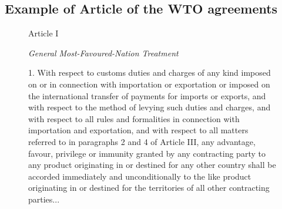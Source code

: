 \documentclass[12pt,letterpaper]{article}
\begin{document}
\begin{appendices}
  \subsection{Example of Article of the WTO agreements}
  \label{fig:gatt_art1}
\begin{figure}[h]
    \begin{center}
        Article I
    \end{center}
    \begin{center}
        \textit{General Most-Favoured-Nation Treatment}
    \end{center}
    1. With respect to customs duties and charges of any kind imposed on or in connection
    with importation or exportation or imposed on the international transfer of payments for
    imports or exports, and with respect to the method of levying such duties and charges, and
    with respect to all rules and formalities in connection with importation and exportation, and
    with respect to all matters referred to in paragraphs 2 and 4 of Article III, any advantage,
    favour, privilege or immunity granted by any contracting party to any product originating in
    or destined for any other country shall be accorded immediately and unconditionally to the
    like product originating in or destined for the territories of all other contracting parties...
\end{figure}


% 
% 


  


\end{appendices}
\end{document}
